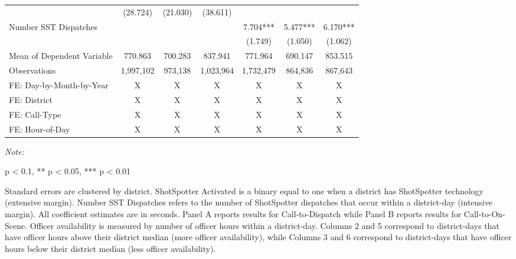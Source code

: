 \begin{table}[H]
\begin{threeparttable}
\begin{tabular}[t]{lcccccc}
\hspace{1em} & (28.724) & (21.030) & (38.611) &  &  & \\
\hspace{1em}Number SST Dispatches &  &  &  & 7.704*** & 5.477*** & 6.170***\\
\hspace{1em} &  &  &  & (1.749) & (1.050) & (1.062)\\
\hspace{1em}Mean of Dependent Variable & 770.863 & 700.283 & 837.941 & 771.964 & 690.147 & 853.515\\
\hspace{1em}Observations & 1,997,102 & 973,138 & 1,023,964 & 1,732,479 & 864,836 & 867,643\\
\midrule
FE: Day-by-Month-by-Year & X & X & X & X & X & X\\
FE: District & X & X & X & X & X & X\\
FE: Call-Type & X & X & X & X & X & X\\
FE: Hour-of-Day & X & X & X & X & X & X\\
\bottomrule
\end{tabular}
\begin{tablenotes}
\item \textit{Note: } 
\item * p < 0.1, ** p < 0.05, *** p < 0.01
\item Standard errors are clustered by district.                       ShotSpotter Activated is a binary equal to one when                      a district has ShotSpotter technology (extensive margin).                      Number SST Dispatches refers to the number of                      ShotSpotter dispatches that occur within a district-day (intensive margin).                      All coefficient estimates are in seconds. Panel A reports results for                      Call-to-Dispatch while Panel B reports results for Call-to-On-Scene.                      Officer availability is measured by number of officer hours within a district-day.                       Columns 2 and 5 correspond to district-days that have officer hours above                      their district median (more officer availability), while Columns 3 and 6 correspond to district-days that                      have officer hours below their district median (less officer availability).                  
\end{tablenotes}
\end{threeparttable}
\end{table}
